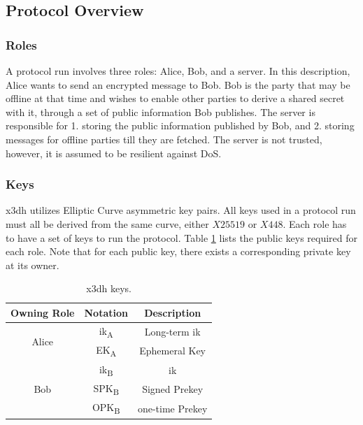 \subsection{Protocol Overview}
\subsubsection{Roles}
A protocol run involves three roles: Alice, Bob, and a server. In this description, Alice wants to send an encrypted message to Bob. Bob is the party that may be offline at that time and wishes to enable other parties to derive a shared secret with it, through a set of public information Bob publishes. The server is responsible for 1. storing the public information published by Bob, and 2. storing messages for offline parties till they are fetched. The server is not trusted, however, it is assumed to be resilient against DoS. %
\subsubsection{Keys}
\gls{x3dh} utilizes Elliptic Curve asymmetric key pairs. All keys used in a protocol run must all be derived from the same curve, either $X25519$ or $X448$. Each role has to have a set of keys to run the protocol. Table \ref{tab:x3dhkeys} lists the public keys required for each role. Note that for each public key, there exists a corresponding private key at its owner.

\begin{table}
	\centering
	\begin{tabular}{|c|c|c|}
		
		\hline
		\rowcolor[rgb]{ .745,  .804,  .843}
		Owning Role 			 & Notation							 & Description 			  \\ \hline\hline
		\multirow{2}{*}{Alice} 	 & \acrshort{ik}\textsubscript{A} 	 & Long-term \acrlong{ik} \\
		& EK\textsubscript{A} 	     		 & Ephemeral Key 		  \\\hline
		\multirow{3}{*}{Bob} 	 & \acrshort{ik}\textsubscript{B} 	 & \acrlong{ik} 		  \\
		& SPK\textsubscript{B} 			 & Signed Prekey 		  \\
		& OPK\textsubscript{B} 	 		 & one-time Prekey 		  \\ \hline
		
	\end{tabular}
	\caption{\gls{x3dh} keys.}
	\label{tab:x3dhkeys}
\end{table}

